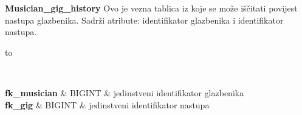 		\textbf{Musician\_gig\_history}
	Ovo je vezna tablica iz koje se može iščitati povijest nastupa glazbenika. Sadrži atribute: identifikator glazbenika i identifikator nastupa.
	\begin{longtabu} to \textwidth {|X[6, l+3]|X[6, l]|X[20, l]|}
		
		\hline {}	 \\[3pt] \hline
		\endfirsthead
		
		\hline 
		\endlastfoot
		
		\textbf{fk\_musician} & BIGINT & jedinstveni identifikator glazbenika \\ \hline
		\textbf{fk\_gig} & BIGINT & jedinstveni identifikator nastupa \\ \hline
		
		
		
	\end{longtabu}
	
